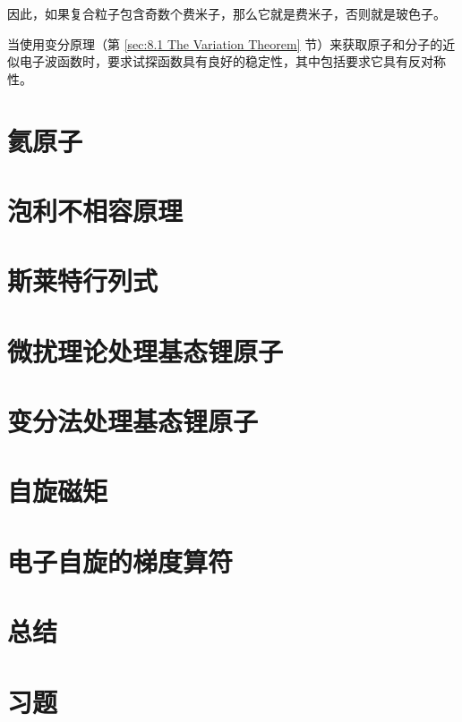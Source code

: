     因此，如果复合粒子包含奇数个费米子，那么它就是费米子，否则就是玻色子。

    当使用变分原理（第 \ref{sec:8.1 The Variation Theorem} 节）来获取原子和分子的近似电子波函数时，要求试探函数具有良好的稳定性，其中包括要求它具有反对称性。

\section{氦原子}
\label{sec:10.4 Th Helium Atom}



















\section{泡利不相容原理}
\label{sec:10.5 The Pauli Exclusion Principle}

\section{斯莱特行列式}
\label{sec:10.6 Slater Determinants}

\section{微扰理论处理基态锂原子}
\label{sec:10.7 Perturbation Treatment of the Lithium Ground State}

\section{变分法处理基态锂原子}
\label{sec:10.8 Variation Treatments of the Lithium Ground State}

\section{自旋磁矩}
\label{sec:10.9 Spin Magnetic Moment}

\section{电子自旋的梯度算符}
\label{sec:10.10 Ladder Operators for Electron Spin}

\section*{总结}

\section*{习题}